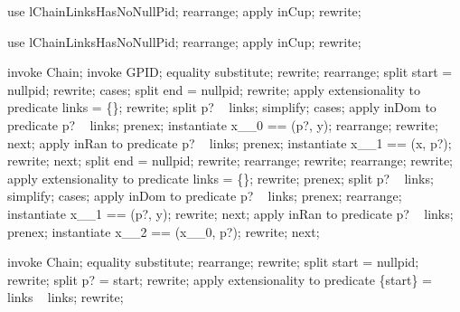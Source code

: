 \begin{forget}[lChainLinksHasNoNullPidInDom]
use lChainLinksHasNoNullPid;
rearrange;
apply inCup;
rewrite;
\end{forget}

\begin{forget}[lChainLinksHasNoNullPidInRan]
use lChainLinksHasNoNullPid;
rearrange;
apply inCup;
rewrite;
\end{forget}

\begin{forget}[lChainElemNonEmptyLinks]
invoke Chain;
invoke GPID;
equality substitute;
rewrite;
rearrange;
split start = nullpid;
rewrite;
cases;
split end = nullpid;
rewrite;
apply extensionality to predicate links = \{\};
rewrite;
split p? \in  \dom~ links;
simplify;
cases;
apply inDom to predicate p? \in  \dom~ links;
prenex;
instantiate x\_\_0 == (p?, y);
rearrange;
rewrite;
next;
apply inRan to predicate p? \in  \ran~  links;
prenex;
instantiate x\_\_1 == (x, p?);
rewrite;
next;
split end = nullpid;
rewrite;
rearrange;
rewrite;
rearrange;
rewrite;
apply extensionality to predicate links = \{\};
rewrite;
prenex;
split p? \in  \dom~ links;
simplify;
cases;
apply inDom to predicate p? \in  \dom~ links;
prenex;
rearrange;
instantiate x\_\_1 == (p?, y);
rewrite;
next;
apply inRan to predicate p? \in  \ran~  links;
prenex;
instantiate x\_\_2 == (x\_\_0, p?);
rewrite;
next;
\end{forget}

\begin{forget}[lChainElemInDom]
invoke Chain;
equality substitute;
rearrange;
rewrite;
split start = nullpid;
rewrite;
split p? = start;
rewrite;
apply extensionality to predicate \{start\} = \dom~ links \setminus  \ran~  links;
rewrite;
\end{forget}



